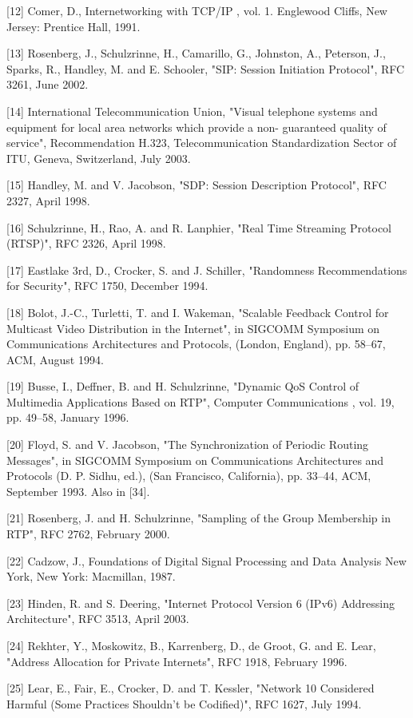 \documentclass{article}
\begin{document}
[12] Comer, D., Internetworking with TCP/IP , vol. 1.  Englewood Cliffs, New Jersey: Prentice Hall, 1991.

[13] Rosenberg, J., Schulzrinne, H., Camarillo, G., Johnston, A., Peterson, J., Sparks, R., Handley, M. and E. Schooler, "SIP: Session Initiation Protocol", RFC 3261, June 2002.

[14] International Telecommunication Union, "Visual telephone systems and equipment for local area networks which provide a non- guaranteed quality of service", Recommendation H.323, Telecommunication Standardization Sector of ITU, Geneva, Switzerland, July 2003.

[15] Handley, M. and V. Jacobson, "SDP: Session Description Protocol", RFC 2327, April 1998.

[16] Schulzrinne, H., Rao, A. and R. Lanphier, "Real Time Streaming Protocol (RTSP)", RFC 2326, April 1998.

[17] Eastlake 3rd, D., Crocker, S. and J. Schiller, "Randomness Recommendations for Security", RFC 1750, December 1994.

[18] Bolot, J.-C., Turletti, T. and I. Wakeman, "Scalable Feedback Control for Multicast Video Distribution in the Internet", in SIGCOMM Symposium on Communications Architectures and Protocols, (London, England), pp. 58--67, ACM, August 1994.

[19] Busse, I., Deffner, B. and H. Schulzrinne, "Dynamic QoS Control of Multimedia Applications Based on RTP", Computer Communications , vol. 19, pp. 49--58, January 1996.

[20] Floyd, S. and V. Jacobson, "The Synchronization of Periodic Routing Messages", in SIGCOMM Symposium on Communications Architectures and Protocols (D. P. Sidhu, ed.), (San Francisco, California), pp. 33--44, ACM, September 1993.  Also in [34].

[21] Rosenberg, J. and H. Schulzrinne, "Sampling of the Group Membership in RTP", RFC 2762, February 2000.

[22] Cadzow, J., Foundations of Digital Signal Processing and Data Analysis New York, New York: Macmillan, 1987.

[23] Hinden, R. and S. Deering, "Internet Protocol Version 6 (IPv6) Addressing Architecture", RFC 3513, April 2003.

[24] Rekhter, Y., Moskowitz, B., Karrenberg, D., de Groot, G. and E. Lear, "Address Allocation for Private Internets", RFC 1918, February 1996.

[25] Lear, E., Fair, E., Crocker, D. and T. Kessler, "Network 10 Considered Harmful (Some Practices Shouldn't be Codified)", RFC 1627, July 1994.
\end{document}
